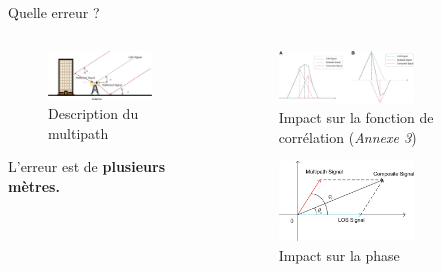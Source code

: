 \documentclass[xcolor=dvipsnames,envcountsect]{beamer}
\begin{document}
\begin{frame}{Quelle erreur ?}
\begin{columns}
	\begin{column}{0.5\textwidth}
		\begin{figure}
			\centering
			\includegraphics[width=0.8\textwidth]{./Figures/mp.jpg}
			\caption {Description du multipath \cite{10.3389/fphy.2022.1071539}}
		\end{figure}
		L'erreur est de \textbf{plusieurs mètres.} \cite{mperr}
	\end{column}
	\begin{column}{0.5\textwidth}
		\begin{figure}
			\centering
			\includegraphics[width=0.7\textwidth]{./Figures/correl.jpg}
			\caption {Impact sur la fonction de corrélation {\tiny (\textit{Annexe 3})}}
		\end{figure}

		\begin{figure}
			\centering
			\includegraphics[width=0.7\textwidth]{./Figures/phase.jpg}
			\caption {Impact sur la phase}
		\end{figure}
	\end{column}
\end{columns}	
\end{frame}
\end{document}
